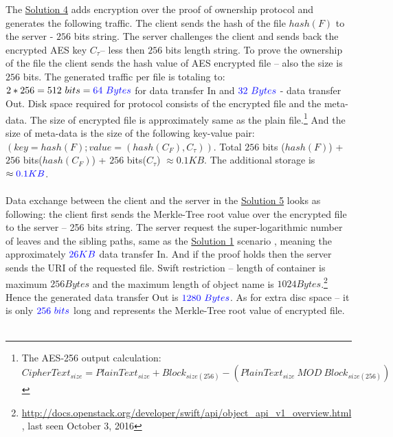 \documentclass[12pt]{article}
\begin{document}
The \hyperref[sub:Soltuion4]{Solution 4} adds encryption over the proof of ownership protocol and generates the following traffic. The client sends the hash of the file $hash(F)$ to the server - $256$ bits string. The server challenges the client and sends back the encrypted AES key $C_\tau$-- less then $256$  bits length string. To prove the ownership of the file the client  sends the hash value of AES encrypted file -- also the size is $256$  bits. The generated traffic per file is totaling to: $2*256=512\ bits=\color{blue}64\ Bytes$ for data transfer In and $\color{blue}32\ Bytes$ - data transfer Out. Disk space required for protocol consists of the encrypted file and the meta-data. The size of encrypted file is approximately same as the plain file.\footnote{The AES-256 output calculation: $CipherText_{size} = PlainText_{size} + Block_{size(256)} - (PlainText_{size}\ MOD\ Block_{size(256)})$}  And the size of meta-data is the size of the following key-value pair: $(key = hash(F); value = (hash(C_F), C_\tau))$. Total  $256$ bits ($hash(F)$) + $256$ bits($hash(C_F)$) + $256$ bits($C_\tau$) $\approx0.1KB$. The additional storage is $\approx\color{blue}0.1KB$.\\\\
Data exchange between the client and the server in the \hyperref[sub:Soltuion5]{Solution 5} looks as  following: the client first sends the Merkle-Tree root value over the encrypted file to the server  -- 256 bits string. The server request the super-logarithmic number of leaves and the sibling paths, same as the \hyperref[sub:Soltuion1]{Solution 1} scenario , meaning the  approximately $\color{blue}26KB$ data transfer In. And if the proof holds then the server sends the URI of the requested file. Swift restriction -- length of container is maximum $256 Bytes$ and the maximum length of object name is $1024 Bytes$.\footnote{\url{http://docs.openstack.org/developer/swift/api/object_api_v1_overview.html}, last seen October 3, 2016} Hence the generated data transfer Out is $\color{blue} 1280\ Bytes$. As for extra disc space -- it is only $\color{blue}256\ bits$  long and represents the Merkle-Tree root value of encrypted file.\\\\
\end{document}
